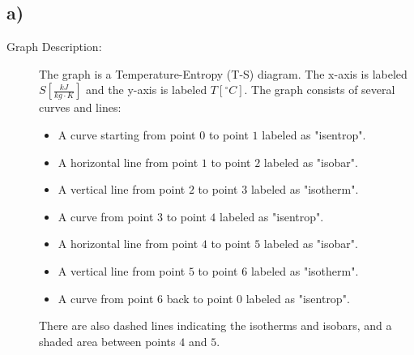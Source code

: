 

\subsection*{a)}

\begin{description}
    \item[Graph Description:] The graph is a Temperature-Entropy (T-S) diagram. The x-axis is labeled $S \left[ \frac{kJ}{kg \cdot K} \right]$ and the y-axis is labeled $T [^\circ C]$. The graph consists of several curves and lines:
    \begin{itemize}
        \item A curve starting from point $0$ to point $1$ labeled as "isentrop".
        \item A horizontal line from point $1$ to point $2$ labeled as "isobar".
        \item A vertical line from point $2$ to point $3$ labeled as "isotherm".
        \item A curve from point $3$ to point $4$ labeled as "isentrop".
        \item A horizontal line from point $4$ to point $5$ labeled as "isobar".
        \item A vertical line from point $5$ to point $6$ labeled as "isotherm".
        \item A curve from point $6$ back to point $0$ labeled as "isentrop".
    \end{itemize}
    There are also dashed lines indicating the isotherms and isobars, and a shaded area between points $4$ and $5$.
\end{description}
